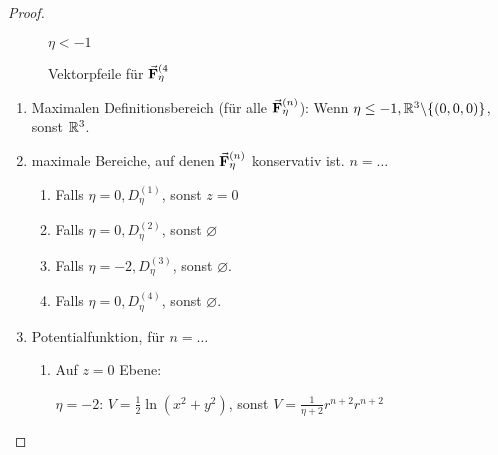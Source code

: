 \begin{proof}
\begin{figure}[h!]
\begin{subcaptionbox}{$\eta<-1$}
		{}
	\end{subcaptionbox}
	\caption{Vektorpfeile f\"{u}r $\va F_\eta^{(4}$}
\end{figure}
\begin{enumerate}
	\item Maximalen Definitionsbereich (f\"{u}r alle $\va F_\eta^{(n)}$): Wenn $\eta\le -1, \mathbb{R}^3\backslash \{(0,0,0)\}$, sonst $\mathbb{R}^3$.
	\item maximale Bereiche, auf denen $\va F_\eta^{(n)}$ konservativ ist. $n=\dots$
	\begin{enumerate}[label=(\arabic*)]
		\item Falls $\eta=0,D_\eta^{(1)}$, sonst $z=0$
		\item Falls $\eta=0, D_\eta^{(2)}$, sonst $\varnothing$
		\item Falls $\eta=-2, D_\eta^{(3)}$, sonst $\varnothing$.
		\item Falls $\eta=0, D_\eta^{(4)}$, sonst $\varnothing$.
	\end{enumerate}
	\item Potentialfunktion, f\"{u}r $n=\dots$
	\begin{enumerate}[label=(\arabic*)]
		\item Auf $z=0$ Ebene:
		
		$\eta=-2$: $V=\frac 12\ln\left(x^2+y^2\right)$, sonst $V=\frac 1{\eta+2}r^{n+2}r^{n+2}$
	\end{enumerate}
\end{enumerate}
\end{proof}
